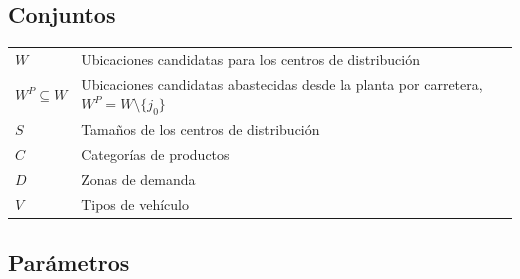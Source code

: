 \documentclass[fleqn, 11pt,letterpaper]{article}
\begin{document}
\subsection*{Conjuntos}
\vspace{2mm}
\begin{tabularx}{\textwidth}{lX}
    $W$ & Ubicaciones candidatas para los centros de distribución\\[1mm]
    $W^{P} \subseteq W$ & Ubicaciones candidatas abastecidas desde la planta por carretera, $W^{P} = W \setminus \{j_0\}$\\[1mm]
    $S$ & Tamaños de los centros de distribución\\[1mm]
    $C$ & Categorías de productos\\[1mm]
    $D$ & Zonas de demanda\\[1mm]
    $V$ & Tipos de vehículo
\end{tabularx}

\subsection*{Parámetros}
\vspace{2mm}
\end{document}
